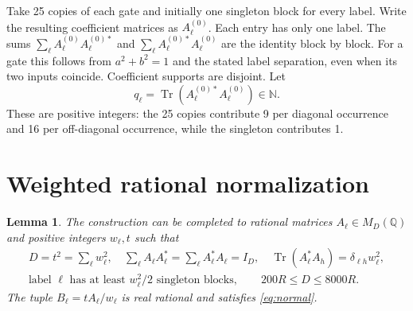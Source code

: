 \documentclass[11pt,a4paper]{article}
\newtheorem{lemma}[theorem]{Lemma}
\newcommand{\Q}{\mathbb Q}
\newcommand{\N}{\mathbb N}
\newcommand{\Tr}{\operatorname{Tr}}
\begin{document}
Take 25 copies of each gate and initially one singleton block for every label. Write the resulting coefficient matrices as $A_\ell^{(0)}$. Each entry has only one label. The sums $\sum_\ell A_\ell^{(0)}A_\ell^{(0)*}$ and $\sum_\ell A_\ell^{(0)*}A_\ell^{(0)}$ are the identity block by block. For a gate this follows from $a^2+b^2=1$ and the stated label separation, even when its two inputs coincide. Coefficient supports are disjoint. Let
\[
 q_\ell=\Tr(A_\ell^{(0)*}A_\ell^{(0)})\in\N.
\]
These are positive integers: the 25 copies contribute 9 per diagonal occurrence and 16 per off-diagonal occurrence, while the singleton contributes 1.

\section{Weighted rational normalization}
\begin{lemma}\label{lem:weights}
The construction can be completed to rational matrices $A_\ell\in M_D(\Q)$ and positive integers $w_\ell,t$ such that
\begin{gather}
 D=t^2=\sum_\ell w_\ell^2,\quad
 \sum_\ell A_\ell A_\ell^*=\sum_\ell A_\ell^*A_\ell=I_D,\quad
 \Tr(A_\ell^*A_h)=\delta_{\ell h}w_\ell^2,               \label{eq:A}\\
 \text{label $\ell$ has at least $w_\ell^2/2$ singleton blocks},
 \qquad 200R\le D\le8000R.                             \label{eq:size}
\end{gather}
The tuple $B_\ell=tA_\ell/w_\ell$ is real rational and satisfies \eqref{eq:normal}.
\end{lemma}
\end{document}
